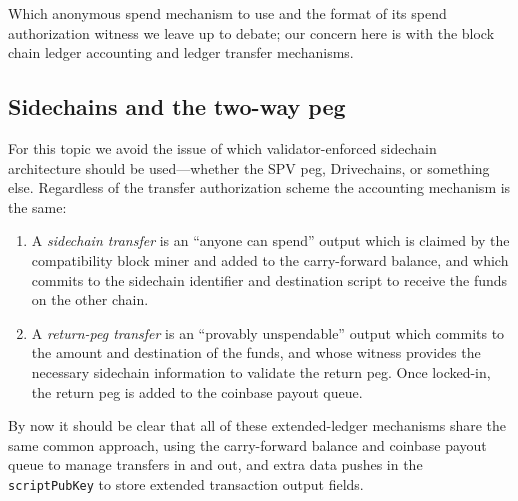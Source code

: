 Which anonymous spend mechanism to use and the format of its spend
authorization witness we leave up to debate; our concern here is with
the block chain ledger accounting and ledger transfer mechanisms.

\subsection{Sidechains and the two-way peg}

For this topic we avoid the issue of which validator-enforced
sidechain architecture should be used---whether the SPV peg,
Drivechains, or something else.  Regardless of the transfer
authorization scheme the accounting mechanism is the same:

\begin{enumerate}

\item

  A \emph{sidechain transfer} is an ``anyone can spend'' output which
  is claimed by the compatibility block miner and added to the
  carry-forward balance, and which commits to the sidechain identifier
  and destination script to receive the funds on the other chain.

\item

  A \emph{return-peg transfer} is an ``provably unspendable'' output
  which commits to the amount and destination of the funds, and whose
  witness provides the necessary sidechain information to validate the
  return peg.  Once locked-in, the return peg is added to the coinbase
  payout queue.

\end{enumerate}

By now it should be clear that all of these extended-ledger mechanisms
share the same common approach, using the carry-forward balance and
coinbase payout queue to manage transfers in and out, and extra data
pushes in the {\tt scriptPubKey} to store extended transaction output
fields.
